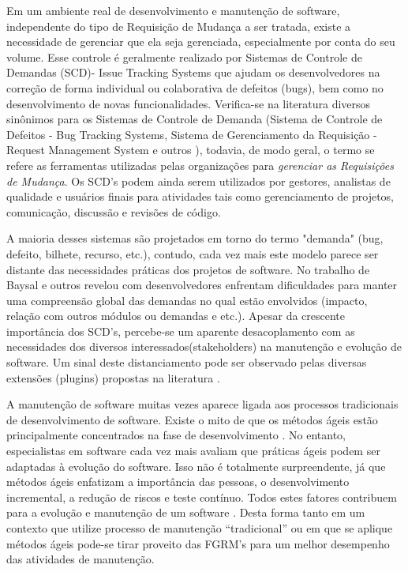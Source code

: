 \documentclass[msc,proposal,hidelot,hideabstract]{ppgccufmg} %
\begin{document}
Em um ambiente real de desenvolvimento e manutenção de software, independente do tipo
de Requisição de Mudança a ser tratada, existe a necessidade de
gerenciar que ela seja gerenciada, especialmente por conta do seu volume. Esse controle é geralmente realizado por Sistemas de Controle de Demandas (SCD)- Issue Tracking Systems  que ajudam
os desenvolvedores na correção de forma individual ou colaborativa de defeitos (bugs), bem como no desenvolvimento de novas funcionalidades. Verifica-se na literatura diversos
sinônimos para os Sistemas de Controle de Demanda (Sistema de Controle de
Defeitos - Bug Tracking Systems, Sistema de Gerenciamento da Requisição -
Request Management System e outros ), todavia, de modo geral, o
termo se refere as ferramentas utilizadas pelas organizações para \textit{gerenciar as Requisições de Mudança}. Os SCD's podem ainda serem utilizados por gestores, analistas de qualidade e usuários finais para atividades tais como gerenciamento de projetos, comunicação, discussão e revisões
de código.

A maioria desses sistemas são projetados em torno do termo "demanda"
(bug, defeito, bilhete, recurso, etc.), contudo, cada vez mais este modelo parece
ser distante das necessidades práticas dos projetos de software. No trabalho de Baysal e outros \cite{Baysal:2013:SAP:2486788.2486957} revelou com desenvolvedores enfrentam dificuldades para manter uma compreensão global das demandas no qual estão envolvidos (impacto, relação com outros módulos ou demandas e etc.). Apesar da crescente importância dos SCD's, percebe-se um aparente desacoplamento com as necessidades dos diversos interessados(stakeholders) na manutenção e evolução de software. Um sinal deste distanciamento pode ser observado pelas diversas extensões (plugins) propostas na literatura \cite{101186,Thung:2014:BIT:2635868.2661678,Kononenko:2014:DED:2591062.2591075}.

A manutenção de software muitas vezes aparece ligada aos processos tradicionais
de desenvolvimento de software. Existe o mito de que os métodos ágeis estão
principalmente concentrados na fase de desenvolvimento
\cite{kajko2009model}. No entanto, especialistas em software cada vez mais
avaliam que práticas ágeis podem ser adaptadas à evolução do software. Isso não
é totalmente surpreendente, já que métodos ágeis enfatizam a importância das
pessoas, o desenvolvimento incremental, a redução de riscos e teste contínuo. Todos estes fatores contribuem para a evolução e manutenção de um software
\cite{thomas2006agile}. Desta forma tanto em um contexto que utilize processo de manutenção
``tradicional'' ou em que se aplique métodos ágeis pode-se tirar proveito das
FGRM's para um melhor desempenho das atividades de manutenção.
\end{document}
